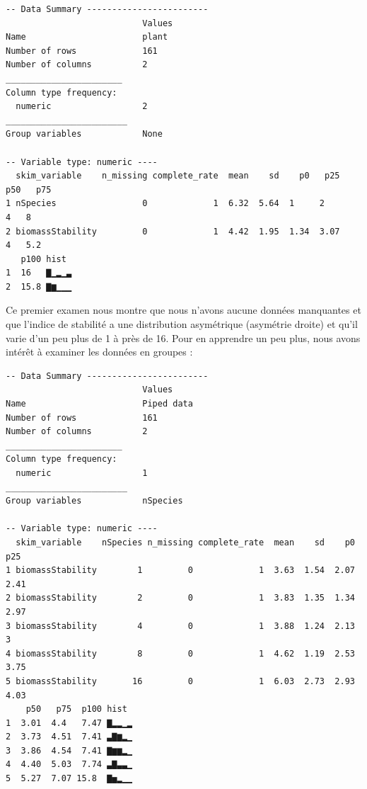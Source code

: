 \documentclass[a4paperpaper,]{article}
\newenvironment{Shaded}{\begin{snugshade}}{\end{snugshade}}
\newcommand{\KeywordTok}[1]{\textcolor[rgb]{0.12,0.11,0.11}{\textbf{#1}}}
\newcommand{\NormalTok}[1]{\textcolor[rgb]{0.12,0.11,0.11}{#1}}
\newcommand{\OperatorTok}[1]{\textcolor[rgb]{0.12,0.11,0.11}{#1}}
\newcommand{\StringTok}[1]{\textcolor[rgb]{0.75,0.01,0.01}{#1}}
\begin{document}
\begin{verbatim}
-- Data Summary ------------------------
                           Values
Name                       plant 
Number of rows             161   
Number of columns          2     
_______________________          
Column type frequency:           
  numeric                  2     
________________________         
Group variables            None  

-- Variable type: numeric ----
  skim_variable    n_missing complete_rate  mean    sd    p0   p25   p50   p75
1 nSpecies                 0             1  6.32  5.64  1     2        4   8  
2 biomassStability         0             1  4.42  1.95  1.34  3.07     4   5.2
   p100 hist 
1  16   ▇▁▂▁▃
2  15.8 ▇▆▁▁▁
\end{verbatim}

Ce premier examen nous montre que nous n'avons aucune données manquantes et que l'indice de stabilité a une distribution asymétrique (asymétrie droite) et qu'il varie d'un peu plus de 1 à près de 16. Pour en apprendre un peu plus, nous avons intérêt à examiner les données en groupes :

\begin{Shaded}
\end{Shaded}

\begin{verbatim}
-- Data Summary ------------------------
                           Values    
Name                       Piped data
Number of rows             161       
Number of columns          2         
_______________________              
Column type frequency:               
  numeric                  1         
________________________             
Group variables            nSpecies  

-- Variable type: numeric ----
  skim_variable    nSpecies n_missing complete_rate  mean    sd    p0   p25
1 biomassStability        1         0             1  3.63  1.54  2.07  2.41
2 biomassStability        2         0             1  3.83  1.35  1.34  2.97
3 biomassStability        4         0             1  3.88  1.24  2.13  3   
4 biomassStability        8         0             1  4.62  1.19  2.53  3.75
5 biomassStability       16         0             1  6.03  2.73  2.93  4.03
    p50   p75  p100 hist 
1  3.01  4.4   7.47 ▇▂▂▁▂
2  3.73  4.51  7.41 ▃▇▆▂▁
3  3.86  4.54  7.41 ▇▆▆▂▁
4  4.40  5.03  7.74 ▃▇▃▃▁
5  5.27  7.07 15.8  ▇▅▂▁▁
\end{verbatim}
\end{document}
